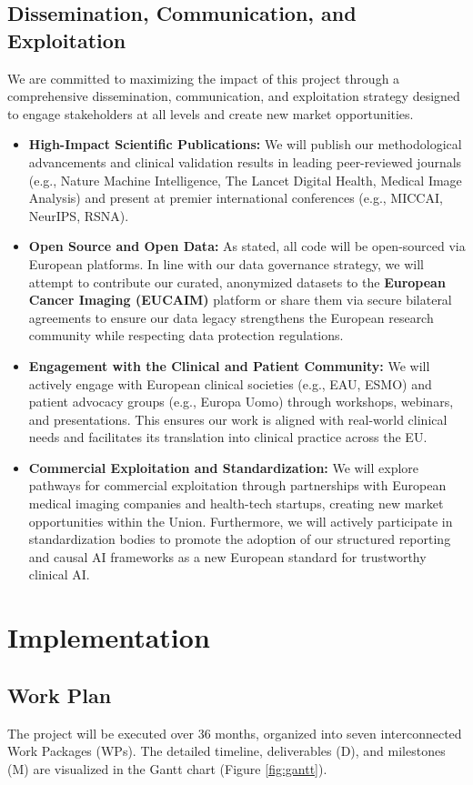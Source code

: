 \documentclass[11pt, a4paper]{article}
\begin{document}
\subsection{Dissemination, Communication, and Exploitation}
We are committed to maximizing the impact of this project through a comprehensive dissemination, communication, and exploitation strategy designed to engage stakeholders at all levels and create new market opportunities.
\begin{itemize}
    \item \textbf{High-Impact Scientific Publications:} We will publish our methodological advancements and clinical validation results in leading peer-reviewed journals (e.g., Nature Machine Intelligence, The Lancet Digital Health, Medical Image Analysis) and present at premier international conferences (e.g., MICCAI, NeurIPS, RSNA).
    \item \textbf{Open Source and Open Data:} As stated, all code will be open-sourced via European platforms. In line with our data governance strategy, we will attempt to contribute our curated, anonymized datasets to the \textbf{European Cancer Imaging (EUCAIM)} platform or share them via secure bilateral agreements to ensure our data legacy strengthens the European research community while respecting data protection regulations.
    \item \textbf{Engagement with the Clinical and Patient Community:} We will actively engage with European clinical societies (e.g., EAU, ESMO) and patient advocacy groups (e.g., Europa Uomo) through workshops, webinars, and presentations. This ensures our work is aligned with real-world clinical needs and facilitates its translation into clinical practice across the EU.
    \item \textbf{Commercial Exploitation and Standardization:} We will explore pathways for commercial exploitation through partnerships with European medical imaging companies and health-tech startups, creating new market opportunities within the Union. Furthermore, we will actively participate in standardization bodies to promote the adoption of our structured reporting and causal AI frameworks as a new European standard for trustworthy clinical AI.
\end{itemize}

\section{Implementation}

\subsection{Work Plan}
The project will be executed over 36 months, organized into seven interconnected Work Packages (WPs). The detailed timeline, deliverables (D), and milestones (M) are visualized in the Gantt chart (Figure \ref{fig:gantt}).
\end{document}
